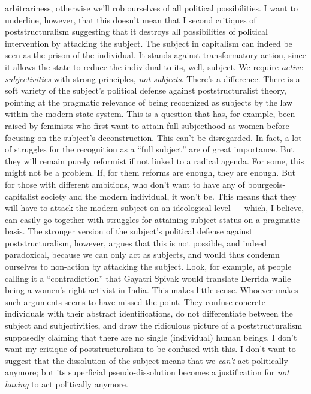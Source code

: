 {    arbitrariness, otherwise we’ll rob ourselves of all political possibilities.
    I want to underline, however, that this doesn’t mean that I second critiques
    of poststructuralism suggesting that it destroys all possibilities of
    political intervention by attacking the subject. The subject in capitalism
    can indeed be seen as the prison of the individual. It stands against
    transformatory action, since it allows the state to reduce the individual to
    its, well, subject. We require \textit{active subjectivities} with strong
    principles, \textit{not subjects}. There’s a difference. There is a soft
    variety of the subject’s political defense against poststructuralist theory,
    pointing at the pragmatic relevance of being recognized as subjects by the
    law within the modern state system. This is a question that has, for
    example, been raised by feminists who first want to attain full subjecthood
    as women before focusing on the subject’s deconstruction. This can’t be
    disregarded. In fact, a lot of struggles for the recognition as a “full
    subject” are of great importance. But they will remain purely reformist if
    not linked to a radical agenda. For some, this might not be a problem. If,
    for them reforms are enough, they are enough. But for those with different
    ambitions, who don’t want to have any of bourgeois-capitalist society and
    the modern individual, it won’t be. This means that they will have to attack
    the modern subject on an ideological level — which, I believe, can easily go
    together with struggles for attaining subject status on a pragmatic basis.
    The stronger version of the subject’s political defense against
    poststructuralism, however, argues that this is not possible, and indeed
    paradoxical, because we can only act as subjects, and would thus condemn
    ourselves to non-action by attacking the subject. Look, for example, at
    people calling it a “contradiction” that Gayatri Spivak would translate
    Derrida while being a women’s right activist in India. This makes little
    sense. Whoever makes such arguments seems to have missed the point. They
    confuse concrete individuals with their abstract identifications, do not
    differentiate between the subject and subjectivities, and draw the
    ridiculous picture of a poststructuralism supposedly claiming that there are
    no single (individual) human beings. I don’t want my critique of
    poststructuralism to be confused with this. I don’t want to suggest that the
    dissolution of the subject means that we \textit{can’t} act politically
    anymore; but its superficial pseudo-dissolution becomes a justification for
    \textit{not having} to act politically anymore.

}
